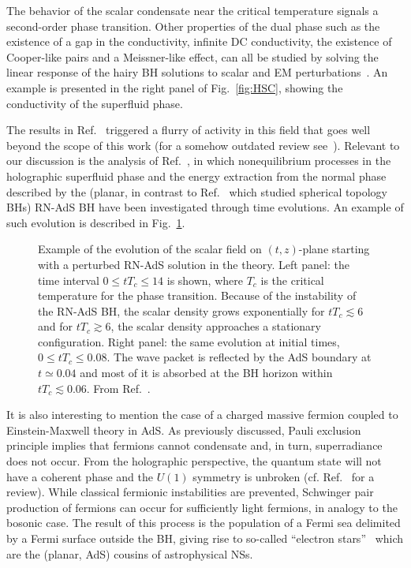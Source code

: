 \documentclass[11pt]{article}
\numberwithin{equation}{section} %
\begin{document}
The behavior of the scalar condensate near the critical temperature signals a second-order phase transition. Other 
properties of the dual phase such as the existence of a gap in the conductivity, infinite DC conductivity, the existence 
of Cooper-like pairs and a Meissner-like effect, can all be studied by solving the linear response of the hairy BH 
solutions to scalar and EM perturbations~\cite{Hartnoll:2009sz}. An example is presented in the right panel of 
Fig.~\ref{fig:HSC}, showing the conductivity of the superfluid phase.

The results in Ref.~\cite{Hartnoll:2008vx} triggered a flurry of activity in this field that goes well beyond the scope of this work (for a somehow outdated review see~\cite{Horowitz:2010gk}). Relevant to our discussion is the analysis of Ref.~\cite{Murata:2010dx}, in which nonequilibrium processes in the holographic superfluid phase and the energy extraction from the normal phase described by the (planar, in contrast to Ref.~\cite{Bosch:2016vcp} which studied spherical topology BHs) RN-AdS BH have been investigated through time evolutions. An example of such evolution is described in Fig.~\ref{fig:HSC_evolution}.



%
\begin{figure}[htbp]
  \centering
  \caption{\label{fig:HSC_evolution}
Example of the evolution of the scalar field on $(t,z)$-plane starting with a perturbed RN-AdS solution in the theory. Left panel: the time interval $0 \leq tT_c \leq 14$ is shown, where $T_c$ is the critical temperature for the phase transition. Because of the instability of the RN-AdS BH,  the scalar density grows exponentially for $tT_c\lesssim 6$ and for $tT_c\gtrsim 6$, the scalar density approaches a stationary configuration.
%
Right panel: the same evolution at initial times, $0 \leq tT_c \leq 0.08$. The wave packet is reflected by the AdS boundary at $t\simeq 0.04$ and most of it is absorbed at the BH horizon within $tT_c\lesssim 0.06$. From Ref.~\cite{Murata:2010dx}.
}
\end{figure}
%




It is also interesting to mention the case of a charged massive fermion coupled to Einstein-Maxwell theory in AdS. As 
previously discussed, Pauli exclusion principle implies that fermions cannot condensate and, in turn, superradiance does 
not occur. From the holographic perspective, the quantum state will not have a coherent phase and the $U(1)$ symmetry is 
unbroken (cf. Ref.~\cite{Hartnoll:2011fn} for a review). While classical fermionic instabilities are prevented, 
Schwinger pair production of fermions can occur for sufficiently light fermions, in analogy to the bosonic case. The 
result of this process is the population of a Fermi sea delimited by a Fermi surface outside the BH, giving rise to 
so-called ``electron stars''~\cite{Hartnoll:2010gu} which are the (planar, AdS) cousins of astrophysical NSs.
\end{document}
